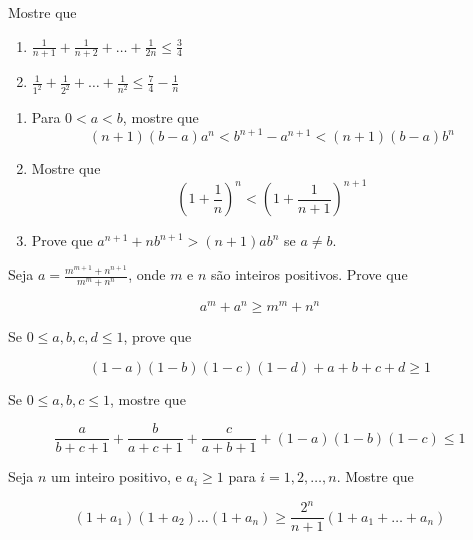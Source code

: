 \begin{questao}
  Mostre que

  \begin{enumerate}

  \item
    $\displaystyle \frac{1}{n+1}+ \frac{1}{n+2}+\ldots+\frac{1}{2n} \leq
    \frac{3}{4}$

  \item
    $\displaystyle \frac{1}{1^2}+ \frac{1}{2^2}+\ldots+\frac{1}{n^2} \leq
    \frac{7}{4} - \frac{1}{n}$
  \end{enumerate}

\end{questao}

\begin{questao}

  \begin{enumerate}

  \item Para $0<a<b$, mostre que
    $$(n+1)(b-a)a^n < b^{n+1}-a^{n+1} < (n+1)(b-a)b^n$$

  \item Mostre que
    $$ \left(1+\frac{1}{n}\right)^n < \left(1+\frac{1}{n+1}\right)^{n+1}$$

  \item Prove que $a^{n+1}+nb^{n+1} > (n+1)ab^n$ se $a \not = b$.
  \end{enumerate}

\end{questao}

\begin{questao}
  Seja $\displaystyle a = \frac{m^{m+1}+n^{n+1}}{m^m+n^n}$, onde $m$ e $n$ são
  inteiros positivos. Prove que

  $$a^m+a^n \geq m^m+n^n$$
\end{questao}

\begin{questao}
  Se $0 \leq a,b,c,d \leq 1$, prove que

  $$(1-a)(1-b)(1-c)(1-d)+a+b+c+d \geq 1$$
\end{questao}

\begin{questao}
  Se $0 \leq a,b,c \leq 1$, mostre que

  $$\frac{a}{b+c+1} + \frac{b}{a+c+1} + \frac{c}{a+b+1} +(1-a)(1-b)(1-c) \leq
  1$$
\end{questao}

\begin{questao}
  Seja $n$ um inteiro positivo, e $a_i \geq 1$ para $i=1,2,\ldots,n$. Mostre que

  $$ (1+a_1)(1+a_2)\ldots(1+a_n) \geq \frac{2^n}{n+1}(1+a_1+\ldots+a_n)$$
\end{questao}

